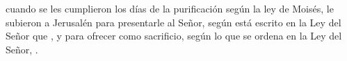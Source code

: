  cuando se les cumplieron los días de la purificación según la ley de Moisés, le subieron a Jerusalén para presentarle al Señor,
según está escrito en la Ley del Señor que , y para ofrecer como sacrificio,
según lo que se ordena en la Ley del Señor, .